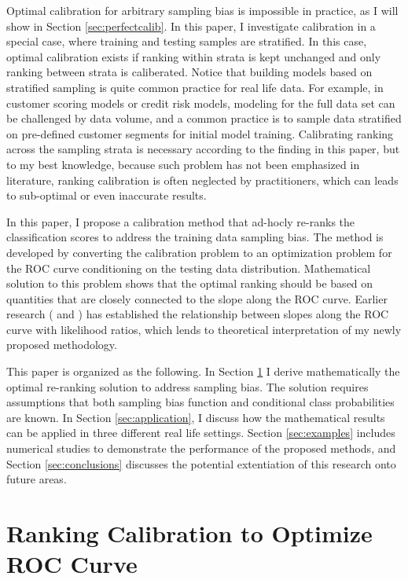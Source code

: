 \documentclass{article} %
\begin{document}
Optimal calibration for arbitrary sampling bias is impossible in practice, as I will show in Section \ref{sec:perfectcalib}. In this paper, I investigate calibration in a special case, where training and testing samples are stratified. In this case, optimal calibration exists if ranking within strata is kept unchanged and only ranking between strata is caliberated. Notice that building models based on stratified sampling is quite common practice for real life data. For example, in customer scoring models or credit risk models, modeling for the full data set can be challenged by data volume, and a common practice is to sample data stratified on pre-defined customer segments for initial model training. Calibrating ranking across the sampling strata is necessary according to the finding in this paper, but to my best knowledge, because such problem has not been emphasized in literature, ranking calibration is often neglected by practitioners, which can leads to sub-optimal or even inaccurate results.

In this paper, I propose a calibration method that ad-hocly re-ranks the classification scores to address the training data sampling bias. The method is developed by converting the calibration problem to an optimization problem for the ROC curve conditioning on the testing data distribution. Mathematical solution to this problem shows that the optimal ranking should be based on quantities that are closely connected to the slope along the ROC curve. Earlier research (\cite{choi1998slopes} and \cite{johnson2004advantages}) has established the relationship between slopes along the ROC curve with likelihood ratios, which lends to theoretical interpretation of my newly proposed methodology. 

This paper is organized as the following. In Section \ref{sec:rerank} I derive mathematically the optimal re-ranking solution to address sampling bias. The solution requires assumptions that both sampling bias function and conditional class probabilities are known. In Section \ref{sec:application}, I discuss how the mathematical results can be applied in three different real life settings. Section \ref{sec:examples} includes numerical studies to demonstrate the performance of the proposed methods, and Section \ref{sec:conclusions} discusses the potential extentiation of this research onto future areas.

\section{Ranking Calibration to Optimize ROC Curve}\label{sec:rerank}
\end{document}
